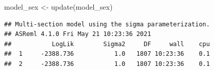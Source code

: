 \documentclass[
  12pt,
]{book}
\newenvironment{Shaded}{\begin{snugshade}}{\end{snugshade}}
\newcommand{\FunctionTok}[1]{\textcolor[rgb]{0.00,0.00,0.00}{#1}}
\newcommand{\NormalTok}[1]{#1}
\newcommand{\OtherTok}[1]{\textcolor[rgb]{0.56,0.35,0.01}{#1}}
\newcommand{\SpecialCharTok}[1]{\textcolor[rgb]{0.00,0.00,0.00}{#1}}
\begin{document}
\begin{Shaded}
\begin{Highlighting}[]
\NormalTok{model\_sex }\OtherTok{\textless{}{-}} \FunctionTok{update}\NormalTok{(model\_sex)}
\end{Highlighting}
\end{Shaded}

\begin{verbatim}
## Multi-section model using the sigma parameterization.
## ASReml 4.1.0 Fri May 21 10:23:36 2021
##           LogLik        Sigma2     DF     wall    cpu
##  1     -2388.736           1.0   1807 10:23:36    0.1
##  2     -2388.736           1.0   1807 10:23:36    0.1
\end{verbatim}

\begin{Shaded}
\end{Shaded}
\end{document}
